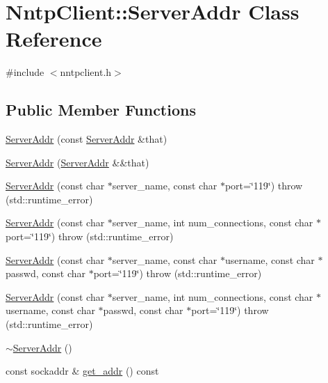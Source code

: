 \hypertarget{class_nntp_client_1_1_server_addr}{}\section{Nntp\+Client\+:\+:Server\+Addr Class Reference}
\label{class_nntp_client_1_1_server_addr}


{\ttfamily \#include $<$nntpclient.\+h$>$}

\subsection*{Public Member Functions}
\begin{DoxyCompactItemize}
\item 
\hyperlink{class_nntp_client_1_1_server_addr_a19b0e0ac59d127ccdadeed1367295c3e}{Server\+Addr} (const \hyperlink{class_nntp_client_1_1_server_addr}{Server\+Addr} \&that)
\item 
\hyperlink{class_nntp_client_1_1_server_addr_aca3ce7af4fab5298a40a0dbe0822918c}{Server\+Addr} (\hyperlink{class_nntp_client_1_1_server_addr}{Server\+Addr} \&\&that)
\item 
\hyperlink{class_nntp_client_1_1_server_addr_a28e3e20d782edd97a25848bd5875d51a}{Server\+Addr} (const char $\ast$server\+\_\+name, const char $\ast$port=\char`\"{}119\char`\"{})  throw (std\+::runtime\+\_\+error)
\item 
\hyperlink{class_nntp_client_1_1_server_addr_a4eb21b6350512f1a6edeb3571feafc7a}{Server\+Addr} (const char $\ast$server\+\_\+name, int num\+\_\+connections, const char $\ast$port=\char`\"{}119\char`\"{})  throw (std\+::runtime\+\_\+error)
\item 
\hyperlink{class_nntp_client_1_1_server_addr_a1aadb75cf311cb757b27e43b4cae4e7f}{Server\+Addr} (const char $\ast$server\+\_\+name, const char $\ast$username, const char $\ast$passwd, const char $\ast$port=\char`\"{}119\char`\"{})  throw (std\+::runtime\+\_\+error)
\item 
\hyperlink{class_nntp_client_1_1_server_addr_a9a237edb548ad3e03d105346edb261a5}{Server\+Addr} (const char $\ast$server\+\_\+name, int num\+\_\+connections, const char $\ast$username, const char $\ast$passwd, const char $\ast$port=\char`\"{}119\char`\"{})  throw (std\+::runtime\+\_\+error)
\item 
\hyperlink{class_nntp_client_1_1_server_addr_ac5497a8edd97dce1d5c6a558e061d533}{$\sim$\+Server\+Addr} ()
\item 
const sockaddr \& \hyperlink{class_nntp_client_1_1_server_addr_a8b7878a4680012c1cd9ce8363c98ade7}{get\+\_\+addr} () const

\end{DoxyCompactItemize}
